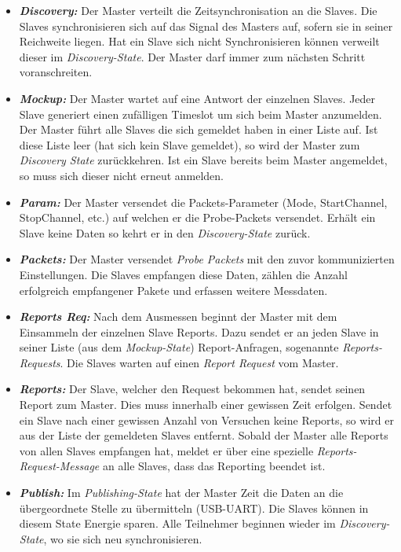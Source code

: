 \begin{itemize}
	\item \textbf{\textit{Discovery:}} Der Master verteilt die Zeitsynchronisation an die Slaves. Die Slaves synchronisieren sich auf das Signal des Masters auf, sofern sie in seiner Reichweite liegen. Hat ein Slave sich nicht Synchronisieren können verweilt dieser im \textit{Discovery-State}. Der Master darf immer zum nächsten Schritt voranschreiten. 
	\item \textbf{\textit{Mockup:}} Der Master wartet auf eine Antwort der einzelnen Slaves. Jeder Slave generiert einen zufälligen Timeslot um sich beim Master anzumelden. Der Master führt alle Slaves die sich gemeldet haben in einer Liste auf. Ist diese Liste leer (hat sich kein Slave gemeldet), so wird der Master zum \textit{Discovery State} zurückkehren. Ist ein Slave bereits beim Master angemeldet, so muss sich dieser nicht erneut anmelden. 
	\item \textbf{\textit{Param:}} Der Master versendet die Packets-Parameter (Mode, StartChannel, StopChannel, etc.) auf welchen er die Probe-Packets versendet. Erhält ein Slave keine Daten so kehrt er in den \textit{Discovery-State} zurück. 
	\item \textbf{\textit{Packets:}} Der Master versendet \textit{Probe Packets} mit den zuvor kommunizierten Einstellungen. Die Slaves empfangen diese Daten, zählen die Anzahl erfolgreich empfangener Pakete und erfassen weitere Messdaten. 
	\item  \textbf{\textit{Reports Req:}} Nach dem Ausmessen beginnt der Master mit dem Einsammeln der einzelnen Slave Reports. Dazu sendet er an jeden Slave in seiner Liste (aus dem \textit{Mockup-State}) Report-Anfragen, sogenannte \textit{Reports-Requests}. Die Slaves warten auf einen \textit{Report Request} vom Master. 
	\item  \textbf{\textit{Reports:}} Der Slave, welcher den Request bekommen hat, sendet seinen Report zum Master. Dies muss innerhalb einer gewissen Zeit erfolgen. Sendet ein Slave nach einer gewissen Anzahl von Versuchen keine Reports, so wird er aus der Liste der gemeldeten Slaves entfernt. Sobald der Master alle Reports von allen Slaves empfangen hat, meldet er über eine spezielle \textit{Reports-Request-Message} an alle Slaves, dass das Reporting beendet ist.
	\item  \textbf{\textit{Publish:}} Im \textit{Publishing-State} hat der Master Zeit die Daten an die übergeordnete Stelle zu übermitteln (USB-UART). Die Slaves können in diesem State Energie sparen. Alle Teilnehmer beginnen wieder im \textit{Discovery-State}, wo sie sich neu synchronisieren. 
\end{itemize}


